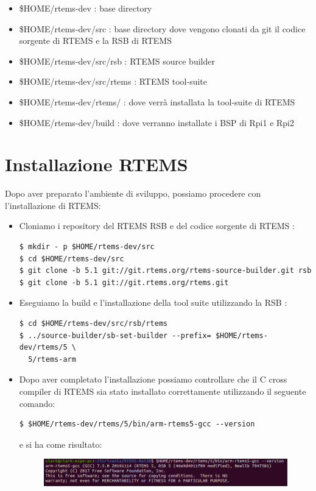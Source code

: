 \documentclass[12pt, a4paper]{article}
\begin{document}
\begin{flushleft}
\begin{itemize}
\item \$HOME/rtems-dev  : base directory
\item \$HOME/rtems-dev/src : base directory dove vengono clonati da git il codice sorgente di RTEMS e la RSB di RTEMS
\item \$HOME/rtems-dev/src/rsb : RTEMS source builder
\item \$HOME/rtems-dev/src/rtems : RTEMS tool-suite
\item \$HOME/rtems-dev/rtems/ : dove verrà installata la tool-suite di RTEMS 
\item \$HOME/rtems-dev/build : dove verranno installate i BSP di Rpi1 e Rpi2
\end{itemize}
\newpage
\section{Installazione RTEMS}

Dopo aver preparato l'ambiente di sviluppo, possiamo procedere con l'installazione di RTEMS:
\begin{itemize}

\item Cloniamo i repository del RTEMS RSB e del codice sorgente di RTEMS : 
\begin{lstlisting}[style=BashStyle] 
$ mkdir - p $HOME/rtems-dev/src
$ cd $HOME/rtems-dev/src
$ git clone -b 5.1 git://git.rtems.org/rtems-source-builder.git rsb
$ git clone -b 5.1 git://git.rtems.org/rtems.git
\end{lstlisting}

\item Eseguiamo la build e l'installazione della tool suite utilizzando la RSB :
\begin{lstlisting}[style=BashStyle] 
$ cd $HOME/rtems-dev/src/rsb/rtems
$ ../source-builder/sb-set-builder --prefix= $HOME/rtems-dev/rtems/5 \
  5/rtems-arm
\end{lstlisting}

\item Dopo aver completato l'installazione possiamo controllare che il C cross compiler di RTEMS sia stato installato correttamente utilizzando il seguente comando: 
\begin{lstlisting}[style=BashStyle] 
$ $HOME/rtems-dev/rtems/5/bin/arm-rtems5-gcc --version
\end{lstlisting}	
e si ha come risultato:
\begin{figure}[h!]
\includegraphics[width=\linewidth]{rtems-gcc-version.png}
\end{figure}


\end{itemize}
\end{flushleft}
\end{document}
